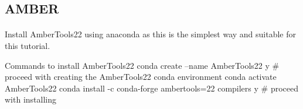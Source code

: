 \subsection{AMBER}
    \paragraph{}
    Install AmberTools22 using anaconda as this is the simplest way and suitable for this tutorial. 
    \begin{bashcmd}[label=listing:AMBERINST]{Commands to install AmberTools22}
    conda create --name AmberTools22
        y   # proceed with creating the AmberTools22 conda environment
    conda activate AmberTools22
    conda install -c conda-forge ambertools=22 compilers
        y   # proceed with installing
    \end{bashcmd}